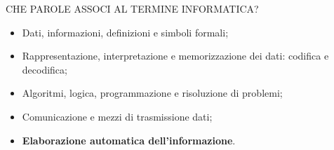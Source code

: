 \documentclass[aspectratio=1610]{beamer}
\begin{document}
\begin{frame}{CHE PAROLE ASSOCI AL TERMINE INFORMATICA?}
    \begin{itemize}
        \item Dati, informazioni, definizioni e simboli formali;
        \item Rappresentazione, interpretazione e memorizzazione dei dati: codifica e decodifica;
        \item Algoritmi, logica, programmazione e risoluzione di problemi;
        \item Comunicazione e mezzi di trasmissione dati;
        \item \textbf{Elaborazione automatica dell'informazione}.
    \end{itemize}
\end{frame}
\end{document}
